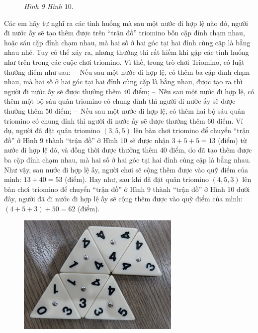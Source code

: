 {\begin{figure}[H]
		\caption{\textit{\small Hình 9 \hspace*{75pt} Hình $10.$}}
		\vspace*{-10pt}
	\end{figure}
	Các em hãy tự nghĩ ra các tình huống mà sau một nước đi hợp lệ nào đó, người đi nước ấy sẽ tạo thêm được trên “trận đồ” \linebreak triomino bốn cặp đỉnh chạm nhau, hoặc sáu cặp đỉnh chạm nhau, mà hai số ở hai góc tại hai đỉnh cùng cặp là bằng nhau nhé.
	\vskip 0.1cm
	Tuy có thể xảy ra, nhưng thường thì rất hiếm khi gặp các tình huống như trên trong các cuộc chơi triomino. Vì thế, trong trò chơi Triomino, có luật thưởng điểm như sau:
	\vskip 0.1cm
	--\ Nếu sau một nước đi hợp lệ, có thêm ba cặp đỉnh chạm nhau, mà hai số ở hai góc tại hai đỉnh cùng cặp là bằng nhau, được tạo ra thì người đi nước ấy sẽ được thưởng thêm $40$ điểm;
	\vskip 0.1cm
	--\ Nếu sau một nước đi hợp lệ, có thêm một bộ sáu quân \linebreak triomino có chung đỉnh thì người đi nước ấy sẽ được thưởng thêm $50$ điểm;
	\vskip 0.1cm
	--\ Nếu sau một nước đi hợp lệ, có thêm hai bộ sáu quân triomino có chung đỉnh thì người đi nước ấy sẽ được thưởng thêm $60$ điểm.
	\vskip 0.1cm
	Ví dụ, người đã đặt quân triomino $(3, 5, 5)$ lên bàn chơi triomino để chuyển “trận đồ” ở Hình $9$ thành “trận đồ” ở Hình $10$ sẽ được nhận
	\vskip 0.1cm
	\hspace*{100pt}$3+5+5=13$ (điểm)
	\vskip 0.1cm
	từ nước đi hợp lệ đó, và đồng thời được thưởng thêm $40$ điểm, do đã tạo thêm được ba cặp đỉnh chạm nhau, mà hai số ở hai góc tại hai đỉnh cùng cặp là bằng nhau. Như vậy, sau nước đi hợp lệ ấy, người chơi sẽ cộng thêm được vào quỹ điểm của mình:
	\vskip 0.1cm
	\hspace*{100pt} $13+40=53$ (điểm).
	\vskip 0.1cm
	Hay như, sau khi đã đặt quân triomino $(4, 5, 3)$ lên bàn chơi \linebreak triomino để chuyển “trận đồ” ở Hình $9$ thành “trận đồ” ở Hình $10$ dưới đây, người đã đi nước đi hợp lệ ấy sẽ cộng thêm được vào quỹ điểm của mình:
	\vskip 0.1cm
	\hspace*{80pt} $(4+5+3)+50 =62$ (điểm).
	\begin{figure}[H]
		\centering
		\captionsetup{labelformat=empty, justification=centering}
		\includegraphics[height=0.3\textwidth]{h9a}

\end{figure}}

